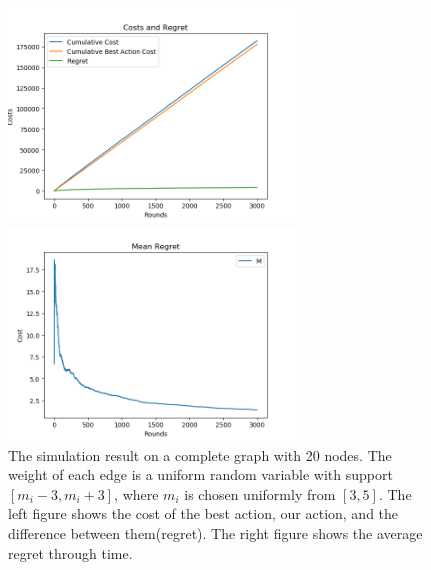 \documentclass{article}
\theoremstyle{plain}
\theoremstyle{definition}
\theoremstyle{remark}
\begin{document}
    \begin{figure}[htbp!]
        \begin{minipage}[h]{0.5\linewidth}
            \centering
            \includegraphics[width=3in]{spanning-cost-regret-uni.png}
        \end{minipage}
        \begin{minipage}[h]{0.5\linewidth}
            \centering
            \includegraphics[width=3in]{spanning-mean-regret-uni.png}
        \end{minipage}
        \caption{The simulation result on a complete graph with 20 nodes. The weight of each edge is a uniform random variable with support $[m_i-3,m_i+3]$, where $m_i$ is chosen uniformly from $[3,5]$. The left figure shows the cost of the best action, our action, and the difference between them(regret). The right figure shows the average regret through time.}
        \label{spanning-uni}
    \end{figure}
\end{document}
